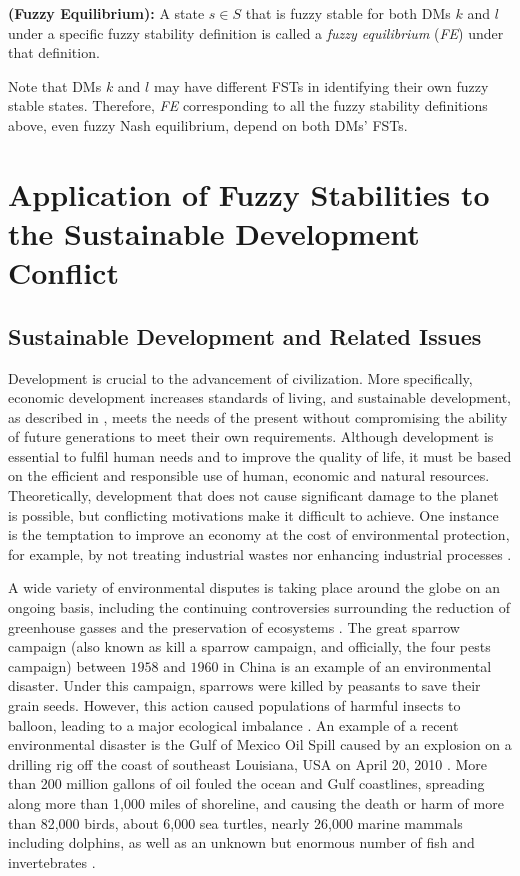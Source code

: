 \begin{definition}
\rm {\bf (Fuzzy Equilibrium):} A state $s \in S$ that is fuzzy stable for both DMs $k$ and $l$ under a specific fuzzy stability definition is called a {\em fuzzy equilibrium} (\emph{FE}) under that definition.
\end{definition}

Note that DMs $k$ and $l$ may have different FSTs in identifying their own fuzzy stable states. Therefore, \emph{FE} corresponding to all the fuzzy stability definitions above, even fuzzy Nash equilibrium, depend on both DMs' FSTs.

\section{Application of Fuzzy Stabilities to the Sustainable Development Conflict}\label{sec-appl-sus-dev}

\subsection{Sustainable Development and Related Issues}

Development is crucial to the advancement of civilization. More specifically, economic development increases standards of living, and sustainable development, as described in \citep{Brundtland1987}, meets the needs of the present without compromising the ability of future generations to meet their own requirements. Although development is essential to fulfil human needs and to improve the quality of life, it must be based on the efficient and responsible use of human, economic and natural resources. Theoretically, development that does not cause significant damage to the planet is possible, but conflicting motivations make it difficult to achieve. One instance is the temptation to improve an economy at the cost of environmental protection, for example, by not treating industrial wastes nor enhancing industrial processes \citep{Gore2006a, Gore2006b, Hipel&Obeidi2005}.

A wide variety of environmental disputes is taking place around the globe on an ongoing basis, including the continuing controversies surrounding the reduction of greenhouse gasses and the preservation of ecosystems \citep{Hipel&Walker2010}. The great sparrow campaign (also known as kill a sparrow campaign, and officially, the four pests campaign) between $1958$ and $1960$ in China is an example of an environmental disaster. Under this campaign, sparrows were killed by peasants to save their grain seeds. However, this action caused populations of harmful insects to balloon, leading to a major ecological imbalance \citep{Shapiro2001}. An example of a recent environmental disaster is the Gulf of Mexico Oil Spill caused by an explosion on a drilling rig off the coast of southeast Louisiana, USA on April 20, 2010 \citep{TNY-times2010, Cntr-Biol-Diversity2011}. More than 200 million gallons of oil fouled the ocean and Gulf coastlines, spreading along more than 1,000 miles of shoreline, and causing the death or harm of more than 82,000 birds, about 6,000 sea turtles, nearly 26,000 marine mammals including dolphins, as well as an unknown but enormous number of fish and invertebrates \citep{Cntr-Biol-Diversity2011}.

